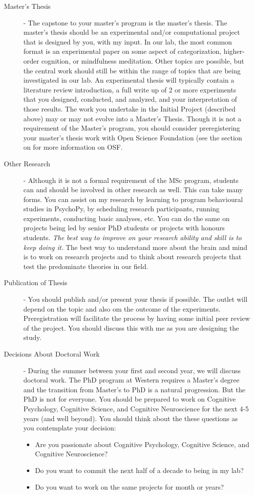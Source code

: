 \documentclass{article}
\begin{document}
\begin{description}
\item [Master's Thesis] - The capstone to your master's program is the master's thesis. The master's thesis should be an experimental and/or computational project that is designed by you, with my input. In our lab, the most common format is an experimental paper on some aspect of categorization, higher-order cognition, or mindfulness meditation. Other topics are possible, but the central work should still be within the range of topics that are being investigated in our lab. An experimental thesis will typically contain a literature review introduction, a full write up of 2 or more experiments that you designed, conducted, and analyzed, and your interpretation of those results. The work you undertake in the Initial Project (described above) may or may not evolve into a Master's Thesis. Though it is not a requirement of the Master's program, you should consider preregistering your master's thesis work with Open Science Foundation (see the section on  for more information on OSF.

\item [Other Research] - Although it is not a formal requirement of the MSc program, students can and should be involved in other research as well. This can take many forms. You can assist on my research by learning to program behavioural studies in PsychoPy, by scheduling research participants, running experiments, conducting basic analyses, etc. You can do the same on projects being led by senior PhD students or projects with honours students. \textit{The best way to improve on your research ability and skill is to keep doing it.} The best way to understand more about the brain and mind is to work on research projects and to think about research projects that test the predominate theories in our field. 

\item [Publication of Thesis] - You should publish and/or present your thesis if possible. The outlet will depend on the topic and also om the outcome of the experiments. Preregistration will facilitate the process by having some initial peer review of the project. You should discuss this with me as you are designing the study.

\item [Decisions About Doctoral Work] - During the summer between your first and second year, we will discuss doctoral work. The PhD program at Western requires a Master's degree and the transition from Master's to PhD is a natural progression. But the PhD is not for everyone. You should be prepared to work on Cognitive Psychology, Cognitive Science, and Cognitive Neuroscience for the next 4-5 years (and well beyond). You should think about the these questions as you contemplate your decision: 
\begin{itemize}
\item Are you passionate about Cognitive Psychology, Cognitive Science, and Cognitive Neuroscience? 
\item Do you want to commit the next half of a decade to being in my lab? 
\item Do you want to work on the same projects for month or years? 
\end{itemize}


\end{description}
\end{document}
